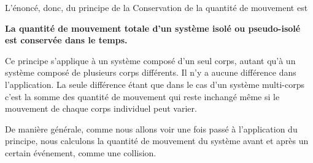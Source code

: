\documentclass[11pt,a4paper]{article}
\begin{document}
L'énoncé, donc, du principe de la Conservation de la quantité de mouvement est 
\begin{shaded}
\textbf{La quantité de mouvement totale d'un système isolé ou pseudo-isolé est conservée dans le temps.} 
\end{shaded}
Ce principe s'applique à un système composé d'un seul corps, autant qu'à un système composé de plusieurs corps différents. Il n'y a aucune différence dans l'application. La seule différence étant que dans le cas d'un système multi-corps c'est la somme des quantité de mouvement qui reste inchangé même si le mouvement de chaque corps individuel peut varier. 

De manière générale, comme nous allons voir une fois passé à l'application du principe, nous calculons la quantité de mouvement du système avant et après un certain événement, comme une collision. 
\end{document}
